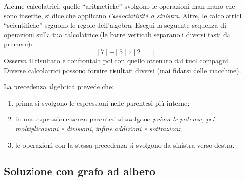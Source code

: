 
\begin{osservazione}{}{} 
Alcune calcolatrici, quelle ``aritmetiche'' svolgono le 
operazioni man mano che sono inserite, si dice che applicano 
\emph{l'associatività a sinistra}. Altre, le calcolatrici ``scientifiche'' 
seguono le regole dell'algebra. 
Esegui la seguente sequenza di operazioni sulla tua calcolatrice 
(le barre verticali separano i diversi tasti da premere):
\[|~7~|+|~5~|\times|~2~|=|\]
Osserva il risultato e confrontalo poi con quello ottenuto dai tuoi 
compagni. 
Diverse calcolatrici possono fornire risultati diversi (mai fidarsi delle
macchine).
\end{osservazione}

La precedenza algebrica prevede che:

\begin{enumerate} [nosep]
\item prima si svolgono le espressioni nelle parentesi più interne; 
\item in una espressione senza parentesi si svolgono 
\emph{prima le potenze}, 
\emph{poi moltiplicazioni e divisioni}, 
\emph{infine addizioni e sottrazioni};
\item le operazioni con la stessa precedenza si svolgono da sinistra verso 
destra.
\end{enumerate}

\subsection{Soluzione con grafo ad albero}

